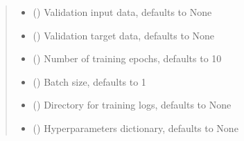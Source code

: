\documentclass[letterpaper,10pt,english]{sphinxmanual}
\begin{document}
\begin{fulllineitems}
\begin{quote}
\begin{description}
\begin{itemize}
\item {} 
\sphinxAtStartPar
{} (\sphinxstyleliteralemphasis{\sphinxupquote{, }}) \textendash{} Validation input data, defaults to None

\item {} 
\sphinxAtStartPar
{} (\sphinxstyleliteralemphasis{\sphinxupquote{, }}) \textendash{} Validation target data, defaults to None

\item {} 
\sphinxAtStartPar
{} (\sphinxstyleliteralemphasis{\sphinxupquote{, }}) \textendash{} Number of training epochs, defaults to 10

\item {} 
\sphinxAtStartPar
{} (\sphinxstyleliteralemphasis{\sphinxupquote{, }}) \textendash{} Batch size, defaults to 1

\item {} 
\sphinxAtStartPar
{} (\sphinxstyleliteralemphasis{\sphinxupquote{, }}) \textendash{} Directory for training logs, defaults to None

\item {} 
\sphinxAtStartPar
{} (\sphinxstyleliteralemphasis{\sphinxupquote{, }}) \textendash{} Hyperparameters dictionary, defaults to None

\end{itemize}

\end{description}\end{quote}

\end{fulllineitems}

\end{document}

